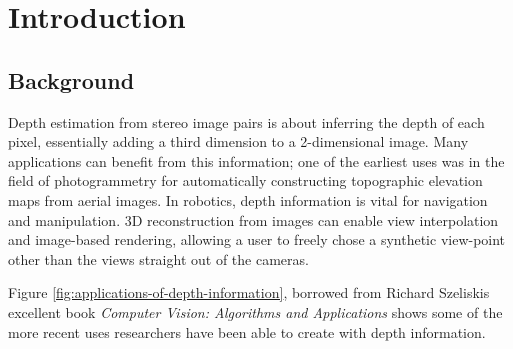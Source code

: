 \chapter{Introduction}\label{chap:intro}

\section{Background}\label{sect:background}

Depth estimation from stereo image pairs is about inferring the depth
of each pixel, essentially adding a third dimension to a 2-dimensional
image. Many applications can benefit from this information; one of the
earliest uses was in the field of photogrammetry for automatically
constructing topographic elevation maps from aerial images. In
robotics, depth information is vital for navigation and manipulation.
3D reconstruction from images can enable view interpolation and
image-based rendering, allowing a user to freely chose a synthetic
view-point other than the views straight out of the cameras.

Figure \ref{fig:applications-of-depth-information}, borrowed from
Richard Szeliskis excellent book \textit{Computer Vision: Algorithms
  and Applications}\cite{computer-vision-book} shows some of the more
recent uses researchers have been able to create with depth
information.

